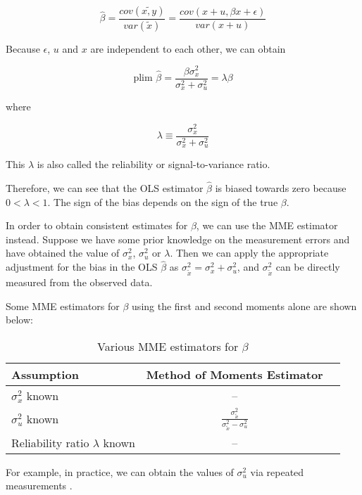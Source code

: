 \documentclass{article}
\begin{document}
\begin{equation}
\hat{\beta} = \frac{cov(\tilde{x, y})}{var(\tilde{x})} = \frac{cov(x+u, \beta x + \epsilon)}{var(x + u)}
\end{equation}

Because $\epsilon$, $u$ and $x$ are independent to each other, we can obtain

\begin{equation}
\textrm{plim } \hat{\beta} = \frac{\beta \sigma^2_x}{\sigma^2_x + \sigma^2_u} = \lambda \beta
\end{equation}

where

\begin{equation}
\lambda \equiv \frac{\sigma_x^2}{\sigma_x^2 + \sigma_u^2}
\end{equation}

This $\lambda$ is also called the reliability or signal-to-variance ratio.

Therefore, we can see that the OLS estimator $\hat{\beta}$ is biased towards zero because $0 < \lambda < 1$. The sign of the bias depends on the sign of the true $\beta$.

In order to obtain consistent estimates for $\beta$, we can use the MME estimator instead.
Suppose we have some prior knowledge on the measurement errors and have obtained the value of $\sigma_x^2$, $\sigma_u^2$ or $\lambda$.
Then we can apply the appropriate adjustment for the bias in the OLS $\hat{\beta}$ as $\sigma^2_{\tilde{x}} = \sigma^2_x + \sigma^2_u$, and $\sigma^2_{\tilde{x}}$ can be directly measured from the observed data. 

Some MME estimators for $\beta$ using the first and second moments alone are shown below:

\begin{table}[ht]
    \centering
    \caption{Various MME estimators for $\beta$}
    \begin{tabular}[t]{lcc}
        \hline
        Assumption&Method of Moments Estimator\\
        \hline
        $\sigma_x^2$ known&--\\
        $\sigma_u^2$ known&$\frac{\sigma^2_{\tilde{x}}}{\sigma^2_{\tilde{x}} - \sigma^2_u}$\\
        Reliability ratio $\lambda$ known&--\\
        \hline
    \end{tabular}
\end{table}%

For example, in practice, we can obtain the values of $\sigma_u^2$ via repeated measurements \cite{mmereport}.
\end{document}
